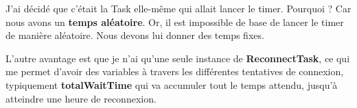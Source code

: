 J'ai décidé que c'était la Task elle-même qui allait lancer le timer. Pourquoi ? Car nous avons un \textbf{temps aléatoire}. Or, il est impossible de base de lancer le timer de manière aléatoire. Nous devons lui donner des temps fixes.

L'autre avantage est que je n'ai qu'une seule instance de \textbf{ReconnectTask}, ce qui me permet d'avoir des variables à travers les différentes tentatives de connexion, typiquement \textbf{totalWaitTime} qui va accumuler tout le temps attendu, jusqu'à atteindre une heure de reconnexion.